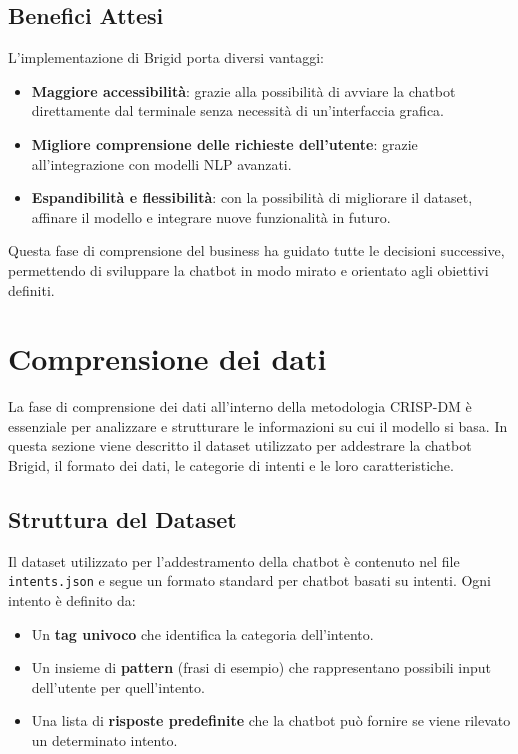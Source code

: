 \documentclass[12pt, letterpaper]{article}
\begin{document}
\subsection{Benefici Attesi}
L’implementazione di Brigid porta diversi vantaggi:
\begin{itemize}	\item \textbf{Maggiore accessibilità}: grazie alla possibilità di avviare la chatbot direttamente dal terminale senza necessità di un’interfaccia grafica.
\item \textbf{Migliore comprensione delle richieste dell’utente}: grazie all’integrazione con modelli NLP avanzati.
\item \textbf{Espandibilità e flessibilità}: con la possibilità di migliorare il dataset, affinare il modello e integrare nuove funzionalità in futuro.
\end{itemize}
Questa fase di comprensione del business ha guidato tutte le decisioni successive, permettendo di sviluppare la chatbot in modo mirato e orientato agli obiettivi definiti.

\section{Comprensione dei dati}
La fase di comprensione dei dati all’interno della metodologia CRISP-DM è essenziale per analizzare e strutturare le informazioni su cui il modello si basa. In questa sezione viene descritto il dataset utilizzato per addestrare la chatbot Brigid, il formato dei dati, le categorie di intenti e le loro caratteristiche.

\subsection{Struttura del Dataset}
Il dataset utilizzato per l’addestramento della chatbot è contenuto nel file \texttt{intents.json} e segue un formato standard per chatbot basati su intenti. Ogni intento è definito da:
\begin{itemize}
	\item Un \textbf{tag univoco} che identifica la categoria dell’intento.
	\item Un insieme di \textbf{pattern} (frasi di esempio) che rappresentano possibili input dell’utente per quell’intento.
	\item Una lista di \textbf{risposte predefinite} che la chatbot può fornire se viene rilevato un determinato intento.
\end{itemize}
\end{document}
